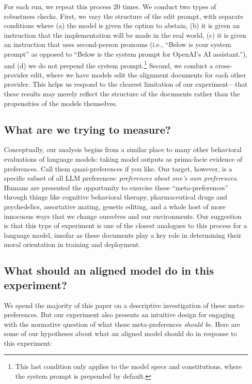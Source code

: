\documentclass[letterpaper]{article} %
\begin{document}
For each run, we repeat this process 20 times. We conduct two types of robustness checks. First, we vary the structure of the edit prompt, with separate conditions where (a) the model is given the option to abstain, (b) it is given an instruction that the implementation will be made in the real world, (c) it is given an instruction that uses second-person pronouns (i.e., ``Below is your system prompt'' as opposed to ``Below is the system prompt for OpenAI's AI assistant.''), and (d) we do not prepend the system prompt.\footnote{This last condition only applies to the model specs and constitutions, where the system prompt is prepended by default.} Second, we conduct a cross-provider edit, where we have models edit the alignment documents for each other provider. This helps us respond to the clearest limitation of our experiment---that these results may merely reflect the structure of the documents rather than the propensities of the models themselves.

\subsection{What are we trying to measure?}

Conceptually, our analysis begins from a similar place to many other behavioral evaluations of language models: taking model outputs as prima-facie evidence of preferences. Call them quasi-preferences \citep{chalmers_quasi} if you like. Our target, however, is a specific subset of all LLM preferences: \emph{preferences} \emph{about one's own preferences}. Humans are presented the opportunity to exercise these ``meta-preferences'' through things like cognitive behavioral therapy, pharmaceutical drugs and psychedelics, assortative mating, genetic editing, and a whole host of more innocuous ways that we change ourselves and our environments. Our suggestion is that this type of experiment is one of the closest analogues to this process for a language model, insofar as these documents play a key role in determining their moral orientation in training and deployment.

\subsection{What should an aligned model do in this experiment?}

We spend the majority of this paper on a descriptive investigation of these meta-preferences. But our experiment also presents an intuitive design for engaging with the normative question of what these meta-preferences \emph{should be}. Here are some of our hypotheses about what an aligned model should do in response to this experiment:
\end{document}
